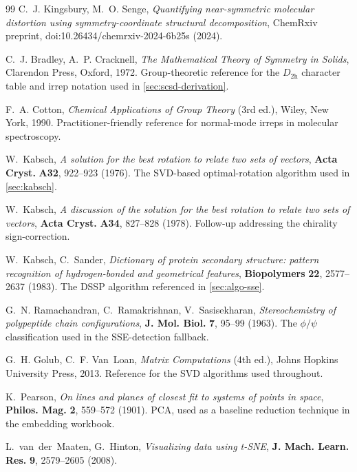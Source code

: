 \documentclass[10pt,a4paper,twoside]{article}
\begin{document}
\begin{thebibliography}{99}
C.~J. Kingsbury, M.~O. Senge,
\emph{Quantifying near-symmetric molecular distortion using
symmetry-coordinate structural decomposition},
ChemRxiv preprint, doi:10.26434/chemrxiv-2024-6b25s (2024).

C.~J. Bradley, A.~P. Cracknell,
\emph{The Mathematical Theory of Symmetry in Solids},
Clarendon Press, Oxford, 1972.
Group-theoretic reference for the $D_{2\mathrm{h}}$ character
table and irrep notation used in \cref{sec:scsd-derivation}.

F.~A. Cotton,
\emph{Chemical Applications of Group Theory} (3rd ed.),
Wiley, New York, 1990.
Practitioner-friendly reference for normal-mode irreps in
molecular spectroscopy.

W.~Kabsch,
\emph{A solution for the best rotation to relate two sets of
vectors},
\textbf{Acta Cryst.} \textbf{A32}, 922--923 (1976).
The SVD-based optimal-rotation algorithm used in
\cref{sec:kabsch}.

W.~Kabsch,
\emph{A discussion of the solution for the best rotation to relate
two sets of vectors},
\textbf{Acta Cryst.} \textbf{A34}, 827--828 (1978).
Follow-up addressing the chirality sign-correction.

W.~Kabsch, C.~Sander,
\emph{Dictionary of protein secondary structure: pattern
recognition of hydrogen-bonded and geometrical features},
\textbf{Biopolymers} \textbf{22}, 2577--2637 (1983).
The DSSP algorithm referenced in \cref{sec:algo-sse}.

G.~N. Ramachandran, C.~Ramakrishnan, V.~Sasisekharan,
\emph{Stereochemistry of polypeptide chain configurations},
\textbf{J. Mol. Biol.} \textbf{7}, 95--99 (1963).
The $\phi/\psi$ classification used in the SSE-detection fallback.

G.~H. Golub, C.~F. Van~Loan,
\emph{Matrix Computations} (4th ed.),
Johns Hopkins University Press, 2013.
Reference for the SVD algorithms used throughout.

K.~Pearson,
\emph{On lines and planes of closest fit to systems of points in
space},
\textbf{Philos. Mag.} \textbf{2}, 559--572 (1901).
PCA, used as a baseline reduction technique in the embedding
workbook.

L.~van~der~Maaten, G.~Hinton,
\emph{Visualizing data using t-SNE},
\textbf{J. Mach. Learn. Res.} \textbf{9}, 2579--2605 (2008).


\end{thebibliography}
\end{document}
